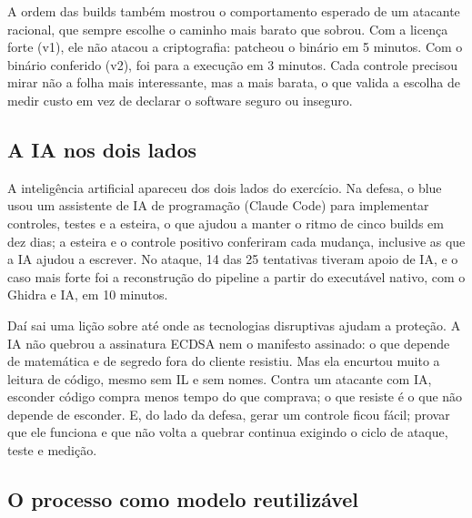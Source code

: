 A ordem das builds também mostrou o comportamento esperado de um atacante racional, que sempre escolhe o caminho mais barato que sobrou. Com a licença forte (v1), ele não atacou a criptografia: patcheou o binário em 5 minutos. Com o binário conferido (v2), foi para a execução em 3 minutos. Cada controle precisou mirar não a folha mais interessante, mas a mais barata, o que valida a escolha de medir custo em vez de declarar o software seguro ou inseguro.

\subsection{A IA nos dois lados}

A inteligência artificial apareceu dos dois lados do exercício. Na defesa, o blue usou um assistente de IA de programação (Claude Code) para implementar controles, testes e a esteira, o que ajudou a manter o ritmo de cinco builds em dez dias; a esteira e o controle positivo conferiram cada mudança, inclusive as que a IA ajudou a escrever. No ataque, 14 das 25 tentativas tiveram apoio de IA, e o caso mais forte foi a reconstrução do pipeline a partir do executável nativo, com o Ghidra e IA, em 10 minutos.

Daí sai uma lição sobre até onde as tecnologias disruptivas ajudam a proteção. A IA não quebrou a assinatura ECDSA nem o manifesto assinado: o que depende de matemática e de segredo fora do cliente resistiu. Mas ela encurtou muito a leitura de código, mesmo sem IL e sem nomes. Contra um atacante com IA, esconder código compra menos tempo do que comprava; o que resiste é o que não depende de esconder. E, do lado da defesa, gerar um controle ficou fácil; provar que ele funciona e que não volta a quebrar continua exigindo o ciclo de ataque, teste e medição.

\subsection{O processo como modelo reutilizável}

